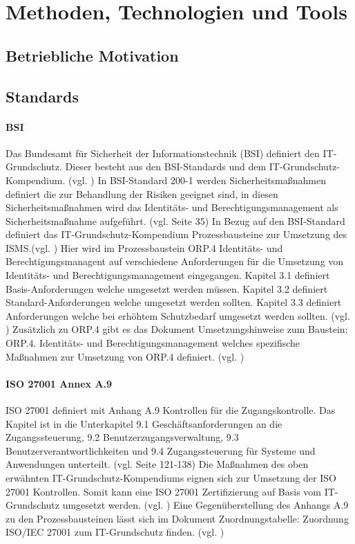 \documentclass[11pt]{article}
\begin{document}
\section{Methoden, Technologien und Tools}
\label{sec:existing}
\subsection{Betriebliche Motivation}
\subsection{Standards}
\paragraph{BSI}
Das Bundesamt für Sicherheit der Informationstechnik (BSI) definiert den IT-Grundschutz. Dieser besteht aus den BSI-Standards und dem IT-Grundschutz-Kompendium. (vgl. \cite{bsi2017grundschutz}) In BSI-Standard 200-1 werden Sicherheitsmaßnahmen definiert die zur Behandlung der Risiken geeignet sind, in diesen Sicherheitsmaßnahmen wird das Identitäts- und Berechtigungsmanagement als Sicherheitsmaßnahme aufgeführt. (vgl. \cite{bsi20172001} Seite 35) In Bezug auf den BSI-Standard definiert das IT-Grundschutz-Kompendium Prozessbausteine zur Umsetzung des ISMS.(vgl. \cite{bsi2023kompendium}) Hier wird im Prozessbaustein \glqq{}ORP.4 Identitäts- und Berechtigungsmanagent\grqq{} auf verschiedene Anforderungen für die Umsetzung von Identitäts- und Berechtigungsmanagement eingegangen. Kapitel 3.1 definiert Basis-Anforderungen welche umgesetzt werden müssen. Kapitel 3.2 definiert Standard-Anforderungen welche umgesetzt werden sollten. Kapitel 3.3 definiert Anforderungen welche bei erhöhtem Schutzbedarf umgesetzt werden sollten. (vgl. \cite{orp4}) Zusätzlich zu ORP.4 gibt es das Dokument \glqq{}Umsetzungshinweise zum Baustein: ORP.4. Identitäts- und Berechtigungsmanagement\grqq{} welches spezifische Maßnahmen zur Umsetzung von ORP.4 definiert. (vgl. \cite{bsi2022umsetzungshinweiseorp4})
\paragraph{ISO 27001 Annex A.9}
ISO 27001 definiert mit Anhang A.9 Kontrollen für die Zugangskontrolle. Das Kapitel ist in die Unterkapitel \glqq{}9.1 Geschäftsanforderungen an die Zugangssteuerung\grqq{}, \glqq{}9.2 Benutzerzugangsverwaltung\grqq{}, \glqq{}9.3 Benutzerverantwortlichkeiten\grqq{} und \glqq{}9.4 Zugangssteuerung für Systeme und Anwendungen\grqq{} unterteilt. (vgl. \cite{kersten2020iso27001} Seite 121-138) Die Maßnahmen des oben erwähnten IT-Grundschutz-Kompendiums eignen sich zur Umsetzung der ISO 27001 Kontrollen. Somit kann eine ISO 27001 Zertifizierung auf Basis vom IT-Grundschutz umgesetzt werden. (vgl. \cite{bsi2023iso27001basis}) Eine Gegenüberstellung des Anhangs A.9 zu den Prozessbausteinen lässt sich im Dokument \glqq{}Zuordnungstabelle: Zuordnung ISO/IEC 27001 zum IT-Grundschutz\grqq{} finden. (vgl. \cite{bsi2021map})
\end{document}
